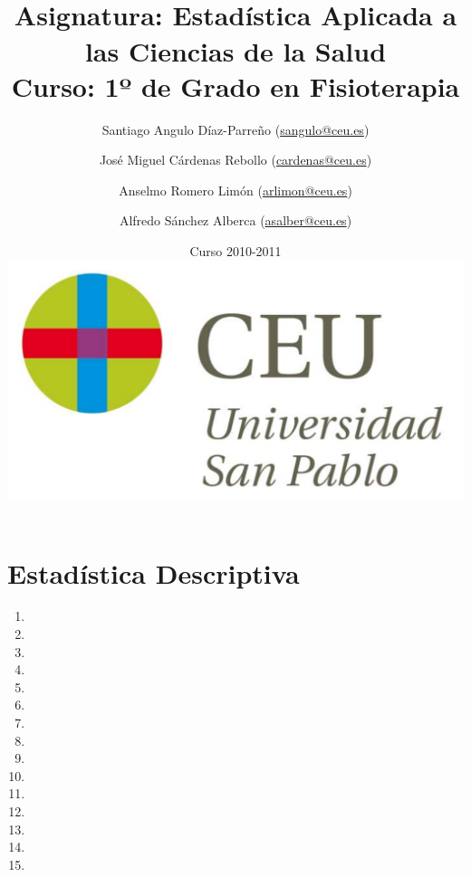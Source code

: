 \documentclass[a4paper,titlepage]{article}
\begin{document}
\sloppy

\title{\vskip 2cm
\shadowbox{\Huge \textbf{\textsf{\quad \textcolor[rgb]{0.00,0.00,0.50}{EJERCICIOS DE ESTADÍSTICA}\quad}}}\\
   \vskip 1cm
   {\Large \textsf{\textcolor[rgb]{0.50,0.00,0.25}{Asignatura: Estadística Aplicada a las Ciencias de la Salud }}}\\
   {\Large \textsf{\textcolor[rgb]{0.50,0.00,0.25}{Curso: 1º de Grado en Fisioterapia}}}
   }
\author{
   Santiago Angulo Díaz-Parreño (\url{sangulo@ceu.es})
   \and
   José Miguel Cárdenas Rebollo (\url{cardenas@ceu.es})
   \and
   Anselmo Romero Limón (\url{arlimon@ceu.es})
   \and
   Alfredo Sánchez Alberca (\url{asalber@ceu.es})
}
\date{Curso 2010-2011\\[1cm]
\includegraphics[scale=0.3]{img/logo_uspceu_01}}

\maketitle
\newpage
\tableofcontents
\newpage









\section{Estadística Descriptiva}
\begin{enumerate}[leftmargin=*]
\item {}
\item {}
\item {}
\item {}
\item {}
\item {}
\item {}
\item {}
\item {}
\item {}
\item {}
\item {}
\item {}
\item {}
\item {}
\end{enumerate}
\end{document}
